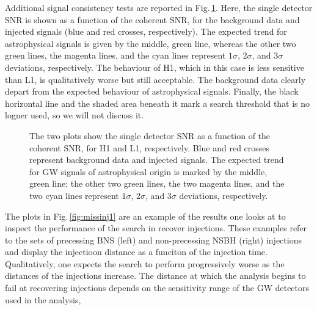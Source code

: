 \documentclass[binding=0.6cm, LaM]{sapthesis}
\begin{document}
	Additional signal consistency tests are reported in Fig.\,\ref{fig:detector1}. 
	Here, the single detector SNR is shown as a function of the coherent SNR, 
	for the background data and injected signals (blue and red crosses, respectively).
	The expected trend for astrophysical signals is given by the middle, green line, 
	whereas the other two green lines, the magenta lines, and the cyan lines represent $1\sigma$, $2\sigma$, 
	and $3\sigma$ deviations, respectively.
	The behaviour of H1, which in this case is less sensitive than L1, 
	is qualitatively worse but still acceptable.  
	The background data clearly depart from the expected behaviour of astrophysical signals.
        Finally, the black horizontal line and the shaded area beneath it mark a search threshold 
	that is no logner used, so we will not discuss it.
        \begin{figure}[!t]
          \noindent
          \label{detector1}
          \centering
          \caption{The two plots show the single detector SNR as a function of the coherent SNR, for H1 and L1, respectively.  Blue and red crosses represent background data and injected signals.  The expected trend for GW signals of astrophysical origin is marked by the middle, green line; the other two green lines, the two magenta lines, and the two cyan lines represent $1\sigma$, $2\sigma$, and $3\sigma$ deviations, respectively.}
          \label{fig:detector1}
        \end{figure}
	The plots in Fig.\,\ref{fig:missinj1} are an example of the results 
	one looks at to inspect the performance of the search in recover injections.
        These examples refer to the sets of precessing BNS (left) and non-precessing NSBH (right) 
	injections and display the injectioon distance as a funciton of the injection time.  
	Qualitatively, one expects the search to perform progressively worse 
	as the distances of the injections increase.
	The distance at which the analysis begins to fail at recovering injections 
	depends on the sensitivity range of the GW detectors used in the analysis, 
\end{document}
